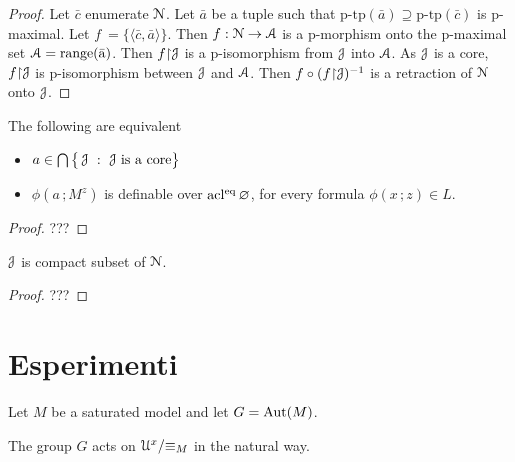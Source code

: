 \begin{proof}
  Let $\bar c$ enumerate $\EuScript N$.
  Let $\bar a$ be a tuple such that $\textrm{p-tp}(\bar a)\supseteq \textrm{p-tp}(\bar c)$ is p-maximal.
  Let $f\ =\{\langle\bar c,\bar a\rangle\}$.
  Then $f:\EuScript N\to\EuScript A$ is a p-morphism onto the p-maximal set $\EuScript A={\rm range(\bar a)}$.
  Then $f{\restriction}\EuScript J$ is a p-isomorphism from $\EuScript J$ into $\EuScript A$.
  As $\EuScript J$ is a core, $f{\restriction}\EuScript J$ is p-isomorphism between $\EuScript J$ and $\EuScript A$.
  Then $f\circ(f{\restriction}\EuScript J)^{-1}$ is a retraction of $\EuScript N$ onto $\EuScript J$.
\end{proof}

\begin{fact}
  The following are equivalent
  \begin{itemize}
    \item[1.] $a\in\bigcap\big\{\,\EuScript J\ :\ \EuScript J \textrm{ is a core}\big\}$
    \item[2.] $\phi(a\,;M^z)$ is definable over ${\rm acl^{eq}}\,\varnothing$, for every formula $\phi(x\,;z)\in L$.
  \end{itemize} 
\end{fact}

\begin{proof}
  ???
\end{proof}

\begin{fact}
  $\EuScript J$ is compact subset of $\EuScript N$.
\end{fact}

\begin{proof}
  ???
\end{proof}

\section{Esperimenti}

Let $M$ be a saturated model and let $G={\rm Aut}(M)$.

The group $G$ acts on $\EuScript U^x/{\equiv_M}$ in the natural way. 


